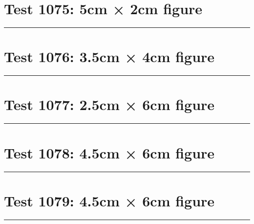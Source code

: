 \documentclass[a4paper,11pt]{article}
\begin{document}
\section*{Test 1075: 5cm × 2cm figure}
\begin{swarmwrap}%
  \begin{minipage}[t]{5cm}
    \centering
    \rule{\linewidth}{2cm}
  \end{minipage}%
\end{swarmwrap}%
\swarmwrapnext
\lipsum[8]
\lipsum[9]
\lipsum[10]
\section*{Test 1076: 3.5cm × 4cm figure}
\begin{swarmwrap}%
  \begin{minipage}[t]{3cm}
    \centering
    \rule{\linewidth}{4cm}
  \end{minipage}%
\end{swarmwrap}%
\swarmwrapnext
\lipsum[16]
\lipsum[17]
\lipsum[18]
\section*{Test 1077: 2.5cm × 6cm figure}
\begin{swarmwrap}%
  \begin{minipage}[t]{2cm}
    \centering
    \rule{\linewidth}{6cm}
  \end{minipage}%
\end{swarmwrap}%
\swarmwrapnext
\lipsum[75]
\lipsum[76]
\lipsum[77]
\lipsum[78]
\section*{Test 1078: 4.5cm × 6cm figure}
\begin{swarmwrap}%
  \begin{minipage}[t]{4cm}
    \centering
    \rule{\linewidth}{6cm}
  \end{minipage}%
\end{swarmwrap}%
\swarmwrapnext
\lipsum[17]
\lipsum[18]
\lipsum[19]
\lipsum[20]
\section*{Test 1079: 4.5cm × 6cm figure}
\begin{swarmwrap}%
  \begin{minipage}[t]{4cm}
    \centering
    \rule{\linewidth}{6cm}
  \end{minipage}%
\end{swarmwrap}%
\swarmwrapnext
\lipsum[140]
\lipsum[141]
\lipsum[142]
\lipsum[143]
\end{document}
